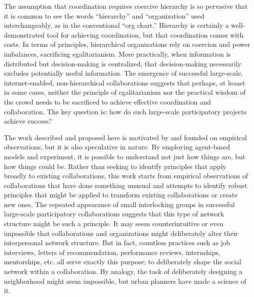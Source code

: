 The assumption that coordination requires coercive hierarchy is so pervasive
that it is common to see the words ``hierarchy'' and ``organization'' used
interchangeably, as in the conventional ``org chart.''
Hierarchy is certainly a well-demonstrated tool for achieving coordination,
but that coordination comes with costs.
In terms of principles, hierarchical organizations rely on coercion and power imbalances,
sacrificing egalitarianism.
More practically, when information is distributed but decision-making is centralized,
that decision-making necessarily excludes potentially useful information.
The emergence of successful large-scale, internet-enabled, non-hierarchical collaborations
suggests that perhaps, at leaast in some cases,
neither the principle of egalitarianism nor the practical wisdom of the
crowd needs to be sacrificed to achieve effective coordination and collaboration.
The key question is: how do such large-scale participatory projects achieve success?

The work described and proposed here is motivated by and founded on empirical observations,
but it is also speculative in nature.
By employing agent-based models and experiment, it is possible to understand
not just how things are, but how things could be.
Rather than seeking to identify principles that apply broadly to existing
collaborations, this work starts from empirical observations of collaborations
that have done something unusual and attempts to identify robust principles
that might be applied to transform existing collaborations or create new ones.
The repeated appearance of small interlocking groups in successful large-scale
participatory collaborations suggests that this type of network structure might
be such a principle.
It may seem counterintuitive or even impossible that collaborations and organizations might deliberately
alter their interpersonal network structure.
But in fact, countless practices such as job interviews, letters of recommendation,
performance reviews, internships, mentorships, etc. all serve exactly this purpose;
to deliberately shape the social network within a collaboration.
By analogy, the task of deliberately designing a neighborhood might seem impossible,
but urban planners have made a science of it.

